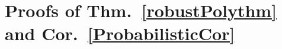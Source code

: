 \documentclass[9pt,twocolumn]{pnas-new}
\begin{document}

\section{Proofs of Thm.~\ref{robustPolythm} and Cor.~\ref{ProbabilisticCor}}\label{AppendixB} %


\end{document}
